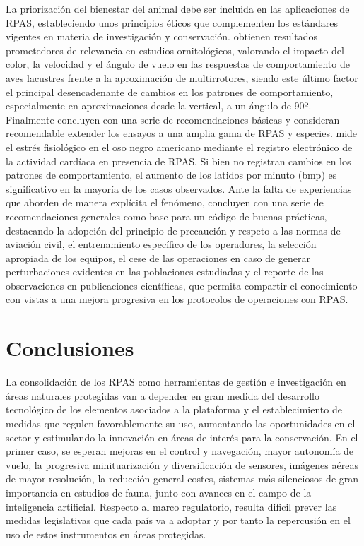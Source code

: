 \documentclass[onecolumn]{extarticle}
\begin{document}
La priorización del bienestar del animal debe ser incluida en las
aplicaciones de RPAS, estableciendo unos principios éticos que
complementen los estándares vigentes en materia de investigación y
conservación. \citep{Vas2015} obtienen resultados prometedores de
relevancia en estudios ornitológicos, valorando el impacto del color, la
velocidad y el ángulo de vuelo en las respuestas de comportamiento de
aves lacustres frente a la aproximación de multirrotores, siendo este
último factor el principal desencadenante de cambios en los patrones de
comportamiento, especialmente en aproximaciones desde la vertical, a un
ángulo de 90º. Finalmente concluyen con una serie de recomendaciones
básicas y consideran recomendable extender los ensayos a una amplia gama
de RPAS y especies. \citep{Ditmer2015} mide el estrés fisiológico en el
oso negro americano mediante el registro electrónico de la actividad
cardíaca en presencia de RPAS. Si bien no registran cambios en los
patrones de comportamiento, el aumento de los latidos por minuto (bmp)
es significativo en la mayoría de los casos observados. Ante la falta de
experiencias que aborden de manera explícita el fenómeno,
\citep{Hodgson2016a} concluyen con una serie de recomendaciones
generales como base para un código de buenas prácticas, destacando la
adopción del principio de precaución y respeto a las normas de aviación
civil, el entrenamiento específico de los operadores, la selección
apropiada de los equipos, el cese de las operaciones en caso de generar
perturbaciones evidentes en las poblaciones estudiadas y el reporte de
las observaciones en publicaciones científicas, que permita compartir el
conocimiento con vistas a una mejora progresiva en los protocolos de
operaciones con RPAS.

\section{Conclusiones}\label{conclusiones}

La consolidación de los RPAS como herramientas de gestión e
investigación en áreas naturales protegidas van a depender en gran
medida del desarrollo tecnológico de los elementos asociados a la
plataforma y el establecimiento de medidas que regulen favorablemente su
uso, aumentando las oportunidades en el sector y estimulando la
innovación en áreas de interés para la conservación. En el primer caso,
se esperan mejoras en el control y navegación, mayor autonomía de vuelo,
la progresiva minituarización y diversificación de sensores, imágenes
aéreas de mayor resolución, la reducción general costes, sistemas más
silenciosos de gran importancia en estudios de fauna, junto con avances
en el campo de la inteligencia artificial. Respecto al marco
regulatorio, resulta dificil prever las medidas legislativas que cada
país va a adoptar y por tanto la repercusión en el uso de estos
instrumentos en áreas protegidas.
\end{document}
